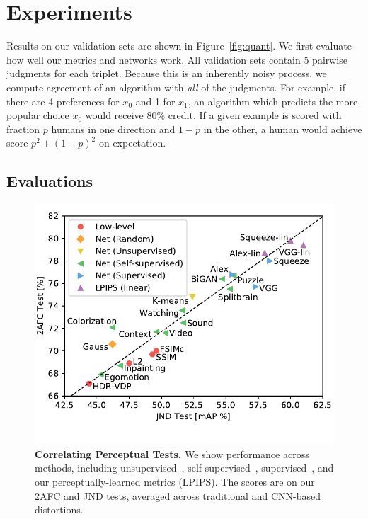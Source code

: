 \section{Experiments}

Results on our validation sets are shown in Figure~\ref{fig:quant}. We first evaluate how well our metrics and networks work. All validation sets contain 5 pairwise judgments for each triplet. Because this is an inherently noisy process, we compute agreement of an algorithm with \textit{all} of the judgments. For example, if there are 4 preferences for $x_0$ and 1 for $x_1$, an algorithm which predicts the more popular choice $x_0$ would receive $80\%$ credit. If a given example is scored with fraction $p$ humans in one direction and $1-p$ in the other, a human would achieve score $p^2+(1-p)^2$ on expectation.

\subsection{Evaluations}

\begin{figure}[t]
  \centering
  \includegraphics[width=1.\linewidth]{imgs/trip_vs_jnd.pdf}
\vspace{-12mm}
\caption{\textbf{Correlating Perceptual Tests.} We show performance across methods, including unsupervised~\cite{krahenbuhl2015data}, self-supervised~\cite{agrawal2015learning,pathakCVPR16context,doersch2015unsupervised,wang2015unsupervised,zhang2016colorful,owens2016visually,pathak2017learning,noroozi2016unsupervised,donahue2016adversarial,zhang2017split}, supervised~\cite{krizhevsky2014one,simonyan2014very,iandola2016squeezenet}, and our perceptually-learned metrics (LPIPS). The scores are on our 2AFC and JND tests, averaged across traditional and CNN-based distortions.}
\label{fig:trip_vs_jnd}
\vspace{-2mm}
\end{figure}

